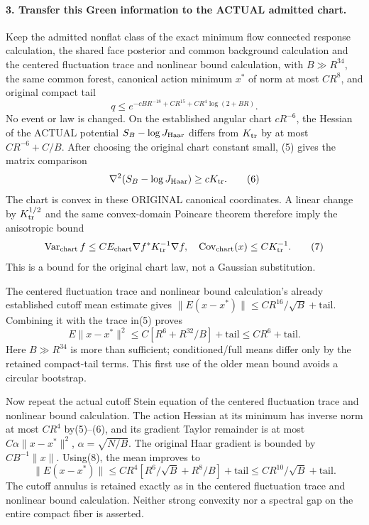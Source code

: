\documentclass[11pt]{article}
\begin{document}
\paragraph{3. Transfer this Green information to the ACTUAL admitted chart.}
Keep the admitted nonflat class of the exact minimum flow connected response calculation, the shared face posterior and common background calculation and the centered fluctuation trace and nonlinear bound calculation, with $B\gg R^{34}$,
the same common forest, canonical action minimum $x^*$ of norm at most $CR^8$,
and original compact tail
\[
 q\le e^{-cBR^{-18}+CR^{15}+CR^4\log(2+BR)}.
\]
No event or law is changed. On the established angular chart $cR^{-6}$,
the Hessian of the ACTUAL potential $S_B-\log J_{\rm Haar}$ differs from
$K_{\rm tr}$ by at most $CR^{-6}+C/B$. After choosing the original chart
constant small, (5) gives the matrix comparison
\[
 \nabla^2(S_B-\log J_{\rm Haar})\ge cK_{\rm tr}.                         \tag{6}
\]
The chart is convex in these ORIGINAL canonical coordinates. A linear change
by $K_{\rm tr}^{1/2}$ and the same convex-domain Poincare theorem therefore
imply the anisotropic bound
\[
 \operatorname{Var}_{\rm chart}f
 \le C E_{\rm chart}\nabla f^*K_{\rm tr}^{-1}\nabla f,
\quad \operatorname{Cov}_{\rm chart}(x)\le C K_{\rm tr}^{-1}.           \tag{7}
\]
This is a bound for the original chart law, not a Gaussian substitution.

The centered fluctuation trace and nonlinear bound calculation's already established cutoff mean estimate gives
$\|E(x-x^*)\|\le CR^{16}/\sqrt B+\text{tail}$. Combining it with the trace
in(5) proves
\[
 E\|x-x^*\|^2\le C[R^6+R^{32}/B]+\text{tail}\le CR^6+\text{tail}.       \tag{8}
\]
Here $B\gg R^{34}$ is more than sufficient; conditioned/full means differ
only by the retained compact-tail terms. This first use of the older mean
bound avoids a circular bootstrap.

Now repeat the actual cutoff Stein equation of the centered fluctuation trace and nonlinear bound calculation. The action Hessian at
its minimum has inverse norm at most $CR^4$ by(5)--(6), and its gradient Taylor
remainder is at most $C\alpha\|x-x^*\|^2$, $\alpha=\sqrt{N/B}$.
The original Haar gradient is bounded by $CB^{-1}\|x\|$.
Using(8), the mean improves to
\[
 \|E(x-x^*)\|\le C R^4[R^6/\sqrt B+R^8/B]+\text{tail}
                    \le CR^{10}/\sqrt B+\text{tail}.                  \tag{9}
\]
The cutoff annulus is retained exactly as in the centered fluctuation trace and nonlinear bound calculation. Neither strong convexity
nor a spectral gap on the entire compact fiber is asserted.
\end{document}
